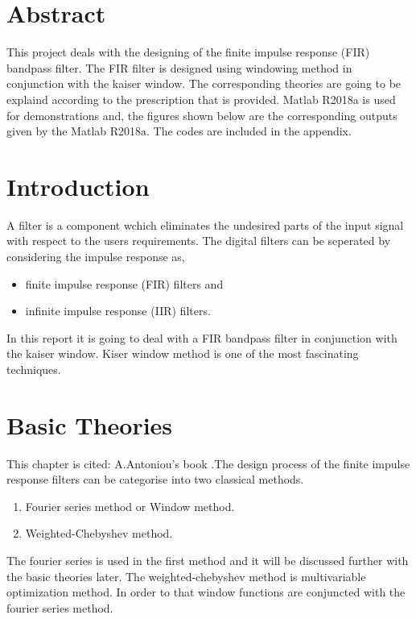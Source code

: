 \documentclass[oneside,11pt,onecolumn,a4paper]{report}
\begin{document}
\chapter{Abstract}
\hspace{4em}This project deals with the designing of the finite impulse response (FIR) bandpass filter. The FIR filter is designed using windowing method in conjunction with the kaiser window. The corresponding theories are going to be explaind according to the prescription that is provided. Matlab R2018a  is used for demonstrations and, the figures shown below  are the corresponding outputs given by the Matlab R2018a. The codes are included in the appendix.
\makeatletter
\patchcmd{\chapter}{\if@openright\cleardoublepage\else\clearpage\fi}{}{}{}
\makeatother

\chapter{Introduction}
\hspace{4em}A filter is a component wchich eliminates the undesired parts of the input signal with respect to the users requirements. The digital filters can be seperated by considering the impulse response as\cite{A.Antoniou},
\begin{itemize}
  \item finite impulse response (FIR) filters and 
  \item infinite impulse response (IIR) filters.
\end{itemize}
In this report it is going to deal with a FIR bandpass filter in conjunction with the kaiser window. Kiser window method is one of the most fascinating techniques.  
\pagebreak


\chapter{Basic Theories}
\hspace{4em}This chapter is cited: A.Antoniou's book \cite{A.Antoniou}.The design process of the finite impulse response filters can be categorise into two classical methods.
\begin{enumerate}
  \item  Fourier series method or Window method.
  \item Weighted-Chebyshev method.
\end{enumerate}
The fourier series is used in the first method and it will be discussed further with the basic theories later. The weighted-chebyshev method is multivariable optimization method. In order to that window functions are conjuncted with the fourier series method.
\end{document}
